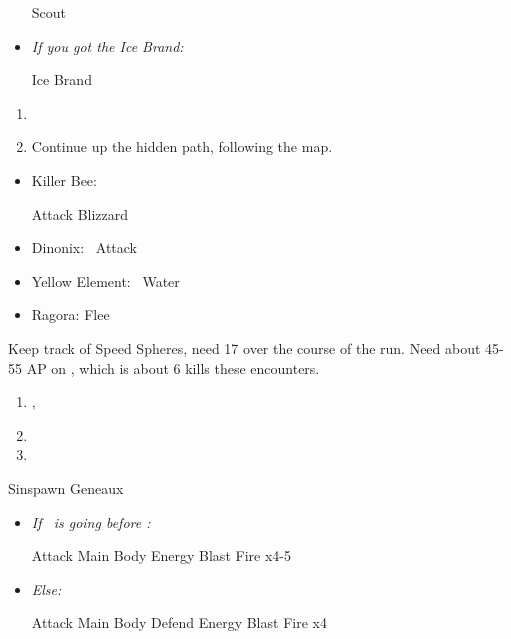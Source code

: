 \begin{equip}
	\begin{itemize}
		\wakkaf Scout
		\item \textit{If you got the Ice Brand:}
		\begin{itemize}
			\tidusf Ice Brand
		\end{itemize}
	\end{itemize}
\end{equip}
\begin{enumerate}[resume]
	\item \formation{\tidus}{\yuna}{\wakka}
	\item Continue up the hidden path, following the map.
\end{enumerate}
\begin{encounters}
	\begin{itemize}
		\item Killer Bee:
			\begin{itemize}
				\wakkaf Attack
				\luluf Blizzard
			\end{itemize}
		\item Dinonix: \tidus\ Attack
		\item Yellow Element: \lulu\ Water
		\item Ragora: Flee
	\end{itemize}
	Keep track of Speed Spheres, need 17 over the course of the run. Need about 45-55 AP on \tidus, which is about 6 kills these encounters.
\end{encounters}
\begin{enumerate}[resume]
	\item\save,  \sd
	\item \formation{\tidus}{\yuna}{\wakka}
	\item \save
\end{enumerate}
\begin{battle}[3000]{Sinspawn Geneaux}
	\begin{itemize}
	\item \textit{If \tidus\ is going before \yuna:}
	\begin{itemize}
		\tidusf Attack Main Body
		\summon{\valefor}
		\valeforf Energy Blast \od
		\valeforf Fire x4-5
	\end{itemize}
	\item \textit{Else:}
	\begin{itemize}
		\switch{\yuna}{\kimahri}
		\kimahrif Attack Main Body
		\tidusf Defend
		\switch{anyone}{\yuna}
		\summon{\valefor}
		\valeforf Energy Blast \od
		\valeforf Fire x4
	\end{itemize}
	\end{itemize}
\end{battle}
